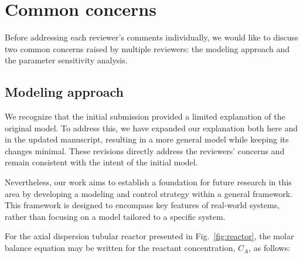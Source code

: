 \documentclass[12pt,answers]{exam}
\begin{document}
\section*{Common concerns}

Before addressing each reviewer's comments individually, we would like to discuss two common concerns raised by multiple reviewers: the modeling approach and the parameter sensitivity analysis.

\subsection*{Modeling approach}

We recognize that the initial submission provided a limited explanation of the original model. To address this, we have expanded our explanation both here and in the updated manuscript, resulting in a more general model while keeping its changes minimal. These revisions directly address the reviewers' concerns and remain consistent with the intent of the initial model.

Nevertheless, our work aims to establish a foundation for future research in this area by developing a modeling and control strategy within a general framework. This framework is designed to encompass key features of real-world systems, rather than focusing on a model tailored to a specific system. 

For the axial dispersion tubular reactor presented in Fig.~\ref{fig:reactor}, the molar balance equation may be written for the reactant concentration, $C_A$, as follows:
\end{document}
